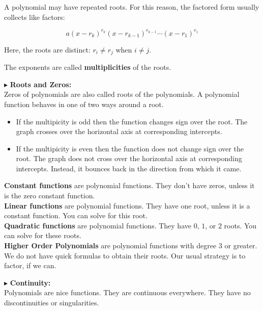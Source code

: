 \documentclass{ximera}
\begin{document}
A polynomial may have repeated roots.  For this reason, the factored form usually collects like factors:


\[   a (x - r_k)^{e_k} (x - r_{k-1})^{e_{k-1}} \cdots (x - r_1)^{e_1}             \]


Here, the roots are distinct:  $r_i \ne r_j$ when $i \ne j$.

The exponents are called \textbf{multiplicities} of the roots. 






$\blacktriangleright$   \textbf{\textcolor{red!10!blue!90!}{Roots and Zeros:}} \\ 
Zeros of polynomials are also called roots of the polynomials.  A polynomial function behaves in one of two ways around a root.

\begin{itemize}
\item If the multipicity is odd then the function changes sign over the root.  The graph crosses over the horizontal axis at corresponding intercepts.
\item If the multipicity is even then the function does not change sign over the root.  The graph does not cross over the horizontal axis at corresponding intercepts. Instead, it bounces back in the direction from which it came.
\end{itemize}


\textbf{Constant functions} are polynomial functions.  They don't have zeros, unless it is the zero constant function.  \\


\textbf{Linear functions} are polynomial functions. They have one root, unless it is a constant function.  You can solve for this root. \\


\textbf{Quadratic functions} are polynomial functions. They have $0$, $1$, or $2$ roots.  You can solve for these roots. \\


\textbf{Higher Order Polynomials} are polynomial functions with degree $3$ or greater.  We do not have quick formulas to obtain their roots.  Our usual strategy is to factor, if we can.  





$\blacktriangleright$ \textbf{\textcolor{red!10!blue!90!}{Continuity:}} \\ 
Polynomials are nice functions.  They are continuous everywhere.  They have no discontinuities or singularities.
\end{document}
